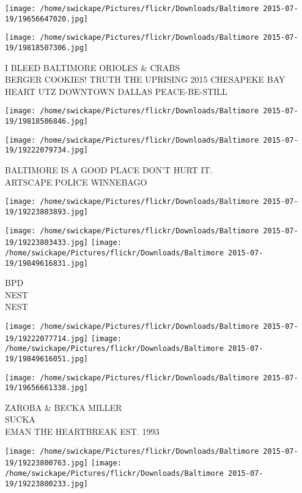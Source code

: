 \documentclass[10pt,letterpaper]{article}
\begin{document}
\texttt{[image: /home/swickape/Pictures/flickr/Downloads/Baltimore 2015-07-19/19656647020.jpg]}

\vspace{0.25in}
\texttt{[image: /home/swickape/Pictures/flickr/Downloads/Baltimore 2015-07-19/19818507306.jpg]}

I BLEED BALTIMORE ORIOLES \& CRABS\\
BERGER COOKIES!  TRUTH THE UPRISING 2015 CHESAPEKE BAY HEART UTZ DOWNTOWN DALLAS PEACE{-}BE{-}STILL\\
\pagebreak

\texttt{[image: /home/swickape/Pictures/flickr/Downloads/Baltimore 2015-07-19/19818506846.jpg]}

\vspace{0.25in}
\texttt{[image: /home/swickape/Pictures/flickr/Downloads/Baltimore 2015-07-19/19222079734.jpg]}

BALTIMORE IS A GOOD PLACE DON'T HURT IT.\\
ARTSCAPE POLICE WINNEBAGO\\
\pagebreak

\texttt{[image: /home/swickape/Pictures/flickr/Downloads/Baltimore 2015-07-19/19223803893.jpg]}

\vspace{0.25in}
\texttt{[image: /home/swickape/Pictures/flickr/Downloads/Baltimore 2015-07-19/19223803433.jpg]}
\texttt{[image: /home/swickape/Pictures/flickr/Downloads/Baltimore 2015-07-19/19849616831.jpg]}

BPD\\
NEST\\
NEST\\
\pagebreak

\texttt{[image: /home/swickape/Pictures/flickr/Downloads/Baltimore 2015-07-19/19222077714.jpg]}
\texttt{[image: /home/swickape/Pictures/flickr/Downloads/Baltimore 2015-07-19/19849616051.jpg]}

\vspace{0.25in}
\texttt{[image: /home/swickape/Pictures/flickr/Downloads/Baltimore 2015-07-19/19656661338.jpg]}

ZAROBA \& BECKA MILLER\\
SUCKA\\
EMAN THE HEARTBREAK EST. 1993\\
\pagebreak

\texttt{[image: /home/swickape/Pictures/flickr/Downloads/Baltimore 2015-07-19/19223800763.jpg]}
\texttt{[image: /home/swickape/Pictures/flickr/Downloads/Baltimore 2015-07-19/19223800233.jpg]}
\end{document}
